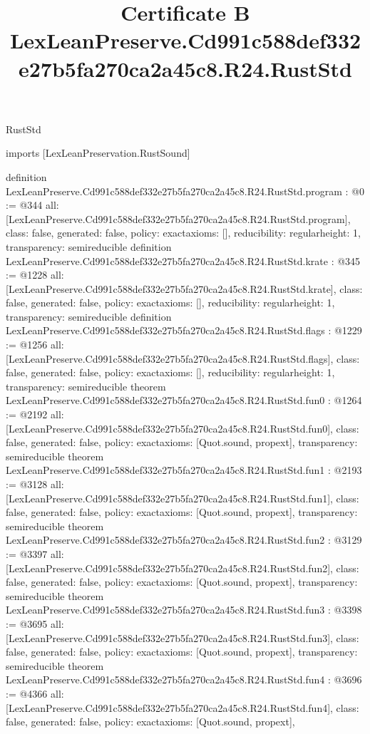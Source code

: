 \begin{lexlean}{RustStd}
\title{Certificate B LexLeanPreserve.Cd991c588def332e27b5fa270ca2a45c8.R24.RustStd}
\begin{coremodule}
imports [LexLeanPreservation.RustSound]

definition LexLeanPreserve.Cd991c588def332e27b5fa270ca2a45c8.R24.RustStd.program : @0 := @344 {
  all: [LexLeanPreserve.Cd991c588def332e27b5fa270ca2a45c8.R24.RustStd.program],
  class: false,
  generated: false,
  policy: exact{axioms: []},
  reducibility: regular{height: 1},
  transparency: semireducible
}
definition LexLeanPreserve.Cd991c588def332e27b5fa270ca2a45c8.R24.RustStd.krate : @345 := @1228 {
  all: [LexLeanPreserve.Cd991c588def332e27b5fa270ca2a45c8.R24.RustStd.krate],
  class: false,
  generated: false,
  policy: exact{axioms: []},
  reducibility: regular{height: 1},
  transparency: semireducible
}
definition LexLeanPreserve.Cd991c588def332e27b5fa270ca2a45c8.R24.RustStd.flags : @1229 := @1256 {
  all: [LexLeanPreserve.Cd991c588def332e27b5fa270ca2a45c8.R24.RustStd.flags],
  class: false,
  generated: false,
  policy: exact{axioms: []},
  reducibility: regular{height: 1},
  transparency: semireducible
}
theorem LexLeanPreserve.Cd991c588def332e27b5fa270ca2a45c8.R24.RustStd.fun0 : @1264 := @2192 {
  all: [LexLeanPreserve.Cd991c588def332e27b5fa270ca2a45c8.R24.RustStd.fun0],
  class: false,
  generated: false,
  policy: exact{axioms: [Quot.sound, propext]},
  transparency: semireducible
}
theorem LexLeanPreserve.Cd991c588def332e27b5fa270ca2a45c8.R24.RustStd.fun1 : @2193 := @3128 {
  all: [LexLeanPreserve.Cd991c588def332e27b5fa270ca2a45c8.R24.RustStd.fun1],
  class: false,
  generated: false,
  policy: exact{axioms: [Quot.sound, propext]},
  transparency: semireducible
}
theorem LexLeanPreserve.Cd991c588def332e27b5fa270ca2a45c8.R24.RustStd.fun2 : @3129 := @3397 {
  all: [LexLeanPreserve.Cd991c588def332e27b5fa270ca2a45c8.R24.RustStd.fun2],
  class: false,
  generated: false,
  policy: exact{axioms: [Quot.sound, propext]},
  transparency: semireducible
}
theorem LexLeanPreserve.Cd991c588def332e27b5fa270ca2a45c8.R24.RustStd.fun3 : @3398 := @3695 {
  all: [LexLeanPreserve.Cd991c588def332e27b5fa270ca2a45c8.R24.RustStd.fun3],
  class: false,
  generated: false,
  policy: exact{axioms: [Quot.sound, propext]},
  transparency: semireducible
}
theorem LexLeanPreserve.Cd991c588def332e27b5fa270ca2a45c8.R24.RustStd.fun4 : @3696 := @4366 {
  all: [LexLeanPreserve.Cd991c588def332e27b5fa270ca2a45c8.R24.RustStd.fun4],
  class: false,
  generated: false,
  policy: exact{axioms: [Quot.sound, propext]},
}
\end{coremodule}
\end{lexlean}
